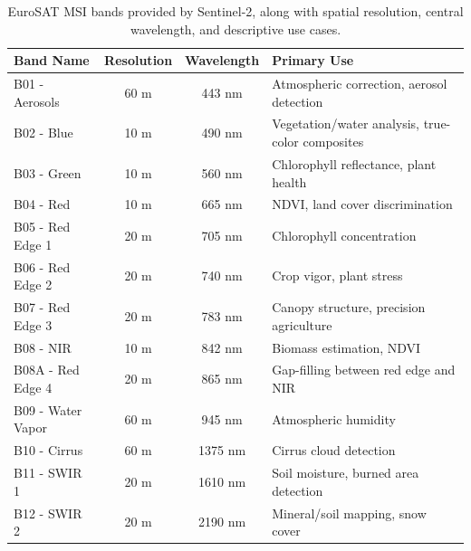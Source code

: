 \documentclass[a4paper, twoside, english]{sapthesis} %
\begin{document}
\begin{table}[H]
\centering
\scriptsize
    \begin{tabular}{lccl}
    \toprule
    \textbf{Band Name} & \textbf{Resolution} & \textbf{Wavelength} & \textbf{Primary Use} \\
    \midrule
    B01 - Aerosols & 60 m & 443 nm & Atmospheric correction, aerosol detection \\
    B02 - Blue & 10 m & 490 nm & Vegetation/water analysis, true-color composites \\
    B03 - Green & 10 m & 560 nm & Chlorophyll reflectance, plant health \\
    B04 - Red & 10 m & 665 nm & NDVI, land cover discrimination \\
    B05 - Red Edge 1 & 20 m & 705 nm & Chlorophyll concentration \\
    B06 - Red Edge 2 & 20 m & 740 nm & Crop vigor, plant stress \\
    B07 - Red Edge 3 & 20 m & 783 nm & Canopy structure, precision agriculture \\
    B08 - NIR & 10 m & 842 nm & Biomass estimation, NDVI \\
    B08A - Red Edge 4 & 20 m & 865 nm  & Gap-filling between red edge and NIR \\
    B09 - Water Vapor & 60 m & 945 nm & Atmospheric humidity \\
    B10 - Cirrus & 60 m & 1375 nm & Cirrus cloud detection \\
    B11 - SWIR 1 & 20 m & 1610 nm & Soil moisture, burned area detection \\
    B12 - SWIR 2 & 20 m & 2190 nm & Mineral/soil mapping, snow cover \\
    \bottomrule
    \end{tabular}
\vspace{0.3cm}
\caption{\normalsize EuroSAT MSI bands provided by Sentinel-2, along with spatial resolution, central wavelength, and descriptive use cases.}
\label{tab:sentinel2_bands}
\end{table}
\end{document}
